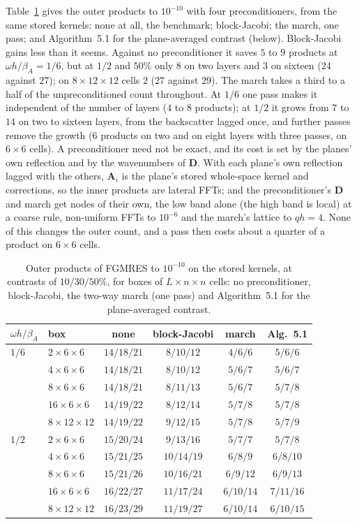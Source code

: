 \documentclass[11pt,a4paper]{article}
\begin{document}
Table~\ref{tab:precond} gives the outer products to $10^{-10}$ with four preconditioners, from the same stored
kernels: none at all, the benchmark; block-Jacobi; the march, one pass; and Algorithm~5.1 for the plane-averaged
contrast (below). Block-Jacobi gains less than it seems. Against no preconditioner it saves $5$ to $9$ products
at $\omega h/\beta_A=1/6$, but at $1/2$ and $50\%$ only $8$ on two layers and $3$ on sixteen ($24$ against $27$);
on $8\times12\times12$ cells $2$ ($27$ against $29$). The march takes a third to a half of the unpreconditioned
count throughout. At $1/6$ one pass makes it independent of the number of layers ($4$ to $8$ products); at $1/2$
it grows from $7$ to $14$ on two to sixteen layers, from the backscatter lagged once, and further passes remove
the growth ($6$ products on two and on eight layers with three passes, on $6\times6$ cells). A preconditioner need
not be exact, and its cost is set by the planes' own reflection and by the wavenumbers of $\mathbf D$. With each
plane's own reflection lagged with the others, $\mathbf A_i$ is the plane's stored whole-space kernel and
corrections, so the inner products are lateral FFTs; and the preconditioner's $\mathbf D$ and march get nodes of
their own, the low band alone (the high band is local) at a coarse rule, non-uniform FFTs to $10^{-6}$ and the
march's lattice to $qh=4$. None of this changes the outer count, and a pass then costs about a quarter of a
product on $6\times6$ cells.

\begin{table}[htbp]
\centering
\caption{Outer products of FGMRES to $10^{-10}$ on the stored kernels, at contrasts of $10/30/50\%$, for boxes of
$L\times n\times n$ cells: no preconditioner, block-Jacobi, the two-way march (one pass) and Algorithm~5.1 for the
plane-averaged contrast.}
\label{tab:precond}
\begin{tabular}{llcccc}
\toprule
$\omega h/\beta_A$ & box & none & block-Jacobi & march & Alg.~5.1 \\
\midrule
$1/6$ & $2\times6\times6$ & $14/18/21$ & $8/10/12$ & $4/6/6$ & $5/6/6$ \\
 & $4\times6\times6$ & $14/18/21$ & $8/10/12$ & $5/6/7$ & $5/6/7$ \\
 & $8\times6\times6$ & $14/18/21$ & $8/11/13$ & $5/6/7$ & $5/7/8$ \\
 & $16\times6\times6$ & $14/19/22$ & $8/12/14$ & $5/7/8$ & $5/7/8$ \\
 & $8\times12\times12$ & $14/19/22$ & $9/12/15$ & $5/7/8$ & $5/7/9$ \\
$1/2$ & $2\times6\times6$ & $15/20/24$ & $9/13/16$ & $5/7/7$ & $5/7/8$ \\
 & $4\times6\times6$ & $15/21/25$ & $10/14/19$ & $6/8/9$ & $6/8/10$ \\
 & $8\times6\times6$ & $15/21/26$ & $10/16/21$ & $6/9/12$ & $6/9/13$ \\
 & $16\times6\times6$ & $16/22/27$ & $11/17/24$ & $6/10/14$ & $7/11/16$ \\
 & $8\times12\times12$ & $16/23/29$ & $11/19/27$ & $6/10/14$ & $6/10/15$ \\
\bottomrule
\end{tabular}
\end{table}
\end{document}
